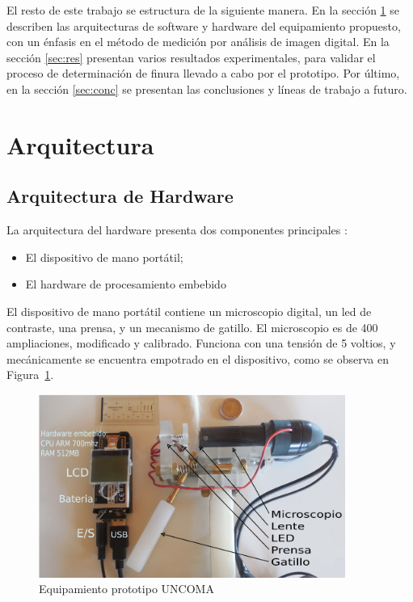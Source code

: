 \documentclass[runningheads,a4paper]{llncs}
\begin{document}
El resto de este trabajo se estructura de la siguiente manera. En la sección \ref{sec:arq} se describen
las arquitecturas de software y hardware del equipamiento propuesto, con un énfasis en
el método de medición por análisis de imagen digital. En la sección \ref{sec:res} presentan varios
resultados experimentales, para validar el proceso de determinación de finura llevado a cabo por el prototipo.
Por último, en la sección \ref{sec:conc} se presentan las conclusiones y líneas de trabajo a futuro.

\section{Arquitectura}\label{sec:arq}

\subsection{Arquitectura de Hardware}

La arquitectura del hardware presenta dos componentes principales :
\begin{itemize}
\item El dispositivo de mano portátil;
\item El hardware de procesamiento embebido
\end{itemize}

El dispositivo de mano portátil contiene un microscopio digital, un led de contraste, una prensa, y un mecanismo de gatillo.
El microscopio es de 400 ampliaciones, modificado y calibrado. Funciona con una tensión de 5 voltios, y mecánicamente se encuentra empotrado en el dispositivo, como se observa en Figura~\ref{fig:prototipo5}.
\begin{figure}
\centering
\includegraphics[height=6cm]{prototipo5}
\caption{Equipamiento prototipo UNCOMA}
\label{fig:prototipo5}
\end{figure}
\end{document}
